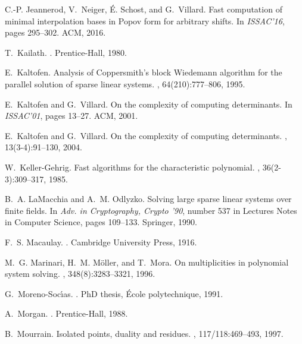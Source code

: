 \documentclass[12pt]{article}
\begin{document}
\begin{thebibliography}{10}
C.-P. Jeannerod, V.~Neiger, \'E. Schost, and G.~Villard.
\newblock Fast computation of minimal interpolation bases in {Popov} form for
  arbitrary shifts.
\newblock In {\em ISSAC'16}, pages 295--302. ACM, 2016.

T.~Kailath.
.
\newblock Prentice-Hall, 1980.

E.~Kaltofen.
\newblock Analysis of {Coppersmith}'s block {Wiedemann} algorithm for the
  parallel solution of sparse linear systems.
, 64(210):777--806, 1995.

E.~Kaltofen and G.~Villard.
\newblock On the complexity of computing determinants.
\newblock In {\em ISSAC'01}, pages 13--27. ACM, 2001.

E.~Kaltofen and G.~Villard.
\newblock On the complexity of computing determinants.
, 13(3-4):91--130, 2004.

W.~Keller-Gehrig.
\newblock Fast algorithms for the characteristic polynomial.
, 36(2-3):309--317, 1985.

B.~A. LaMacchia and A.~M. Odlyzko.
\newblock Solving large sparse linear systems over finite fields.
\newblock In {\em Adv. in Cryptography, Crypto '90}, number 537 in Lectures
  Notes in Computer Science, pages 109--133. Springer, 1990.

F.~S. Macaulay.
.
\newblock Cambridge University Press, 1916.

M.~G. Marinari, H.~M. M{\"o}ller, and T.~Mora.
\newblock On multiplicities in polynomial system solving.
, 348(8):3283--3321, 1996.

G.~Moreno-Soc{\'\i}as.
.
\newblock PhD thesis, \'Ecole polytechnique, 1991.

A.~Morgan.
.
\newblock Prentice-Hall, 1988.

B.~Mourrain.
\newblock Isolated points, duality and residues.
, 117/118:469--493, 1997.


\end{thebibliography}
\end{document}
